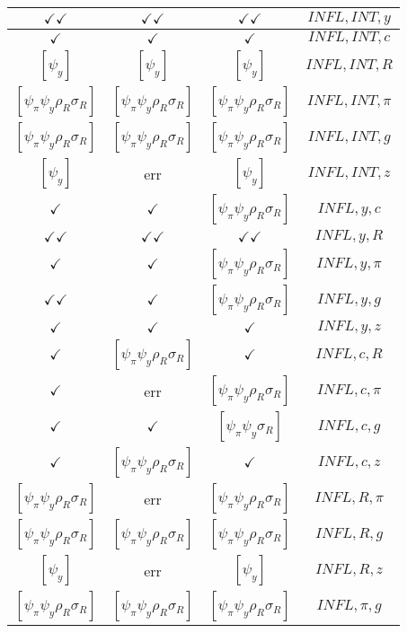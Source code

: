 \documentclass[a4paper,10pt]{article}
\begin{document}
\begin{longtable}{|c|c|c|c|}
\hline
$\checkmark\checkmark$ & $\checkmark\checkmark$ & $\checkmark\checkmark$ & ${INFL},{INT},{y}$ \\
\hline
$\checkmark$ & $\checkmark$ & $\checkmark$ & ${INFL},{INT},{c}$ \\
\hline
$[\psi_y ]$ & $[\psi_y ]$ & $[\psi_y ]$ & ${INFL},{INT},{R}$ \\
\hline
$[\psi_\pi \psi_y \rho_R \sigma_R ]$ & $[\psi_\pi \psi_y \rho_R \sigma_R ]$ & $[\psi_\pi \psi_y \rho_R \sigma_R ]$ & ${INFL},{INT},{\pi}$ \\
\hline
$[\psi_\pi \psi_y \rho_R \sigma_R ]$ & $[\psi_\pi \psi_y \rho_R \sigma_R ]$ & $[\psi_\pi \psi_y \rho_R \sigma_R ]$ & ${INFL},{INT},{g}$ \\
\hline
$[\psi_y ]$ & err & $[\psi_y ]$ & ${INFL},{INT},{z}$ \\
\hline
$\checkmark$ & $\checkmark$ & $[\psi_\pi \psi_y \rho_R \sigma_R ]$ & ${INFL},{y},{c}$ \\
\hline
$\checkmark\checkmark$ & $\checkmark\checkmark$ & $\checkmark\checkmark$ & ${INFL},{y},{R}$ \\
\hline
$\checkmark$ & $\checkmark$ & $[\psi_\pi \psi_y \rho_R \sigma_R ]$ & ${INFL},{y},{\pi}$ \\
\hline
$\checkmark\checkmark$ & $\checkmark$ & $[\psi_\pi \psi_y \rho_R \sigma_R ]$ & ${INFL},{y},{g}$ \\
\hline
$\checkmark$ & $\checkmark$ & $\checkmark$ & ${INFL},{y},{z}$ \\
\hline
$\checkmark$ & $[\psi_\pi \psi_y \rho_R \sigma_R ]$ & $\checkmark$ & ${INFL},{c},{R}$ \\
\hline
$\checkmark$ & err & $[\psi_\pi \psi_y \rho_R \sigma_R ]$ & ${INFL},{c},{\pi}$ \\
\hline
$\checkmark$ & $\checkmark$ & $[\psi_\pi \psi_y \sigma_R ]$ & ${INFL},{c},{g}$ \\
\hline
$\checkmark$ & $[\psi_\pi \psi_y \rho_R \sigma_R ]$ & $\checkmark$ & ${INFL},{c},{z}$ \\
\hline
$[\psi_\pi \psi_y \rho_R \sigma_R ]$ & err & $[\psi_\pi \psi_y \rho_R \sigma_R ]$ & ${INFL},{R},{\pi}$ \\
\hline
$[\psi_\pi \psi_y \rho_R \sigma_R ]$ & $[\psi_\pi \psi_y \rho_R \sigma_R ]$ & $[\psi_\pi \psi_y \rho_R \sigma_R ]$ & ${INFL},{R},{g}$ \\
\hline
$[\psi_y ]$ & err & $[\psi_y ]$ & ${INFL},{R},{z}$ \\
\hline
$[\psi_\pi \psi_y \rho_R \sigma_R ]$ & $[\psi_\pi \psi_y \rho_R \sigma_R ]$ & $[\psi_\pi \psi_y \rho_R \sigma_R ]$ & ${INFL},{\pi},{g}$ \\

\end{longtable}
\end{document}
